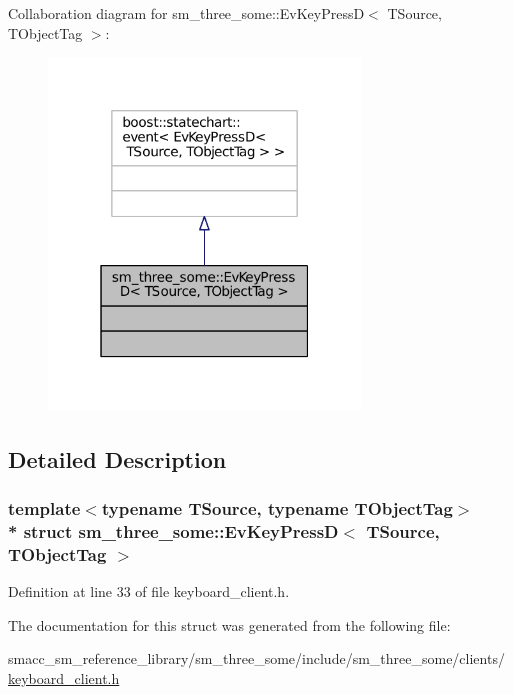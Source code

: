 Collaboration diagram for sm\+\_\+three\+\_\+some\+:\+:Ev\+Key\+PressD$<$ T\+Source, T\+Object\+Tag $>$\+:
\nopagebreak
\begin{figure}[H]
\begin{center}
\leavevmode
\includegraphics[width=235pt]{structsm__three__some_1_1EvKeyPressD__coll__graph}
\end{center}
\end{figure}


\subsection{Detailed Description}
\subsubsection*{template$<$typename T\+Source, typename T\+Object\+Tag$>$\\*
struct sm\+\_\+three\+\_\+some\+::\+Ev\+Key\+Press\+D$<$ T\+Source, T\+Object\+Tag $>$}



Definition at line 33 of file keyboard\+\_\+client.\+h.



The documentation for this struct was generated from the following file\+:\begin{DoxyCompactItemize}
\item 
smacc\+\_\+sm\+\_\+reference\+\_\+library/sm\+\_\+three\+\_\+some/include/sm\+\_\+three\+\_\+some/clients/\hyperlink{keyboard__client_8h}{keyboard\+\_\+client.\+h}\end{DoxyCompactItemize}
